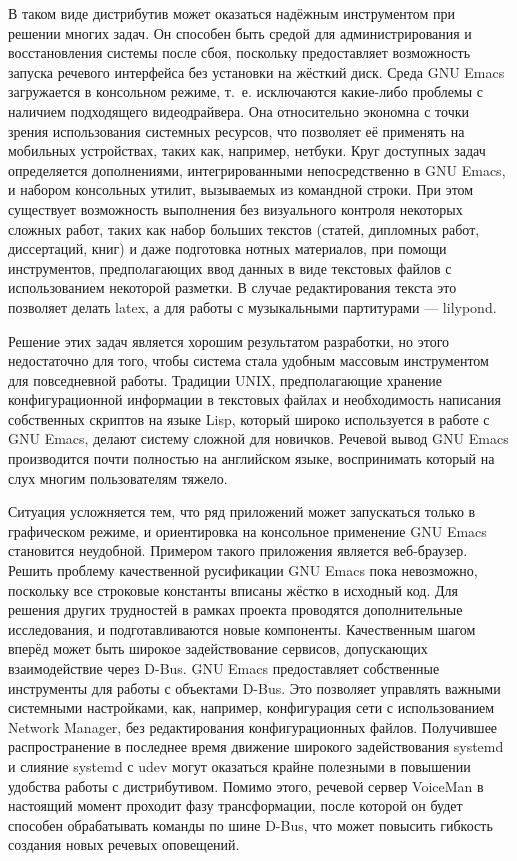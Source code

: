 \documentclass[10pt, a5paper]{article}
\begin{document}
В таком виде дистрибутив может оказаться надёжным инструментом при решении многих задач. Он способен быть средой для администрирования и восстановления системы после сбоя, поскольку предоставляет возможность запуска речевого интерфейса без установки на жёсткий диск. Среда GNU Emacs загружается в консольном режиме, т.~е. исключаются какие-либо проблемы с наличием подходящего видеодрайвера. Она относительно экономна с точки зрения использования системных ресурсов, что позволяет её применять на мобильных устройствах, таких как, например, нетбуки. Круг доступных задач определяется дополнениями, интегрированными непосредственно в GNU Emacs, и набором консольных утилит, вызываемых из командной строки. При этом существует возможность выполнения без визуального контроля некоторых сложных работ, таких как набор больших текстов (статей, дипломных работ, диссертаций, книг) и даже подготовка нотных материалов, при помощи инструментов, предполагающих ввод данных в виде текстовых файлов с использованием некоторой разметки. В случае редактирования текста это позволяет делать latex, а для работы с музыкальными партитурами --- lilypond.

Решение этих задач является хорошим результатом разработки, но этого 
недостаточно для того, чтобы система стала удобным массовым инструментом для повседневной работы. Традиции UNIX, предполагающие хранение конфигурационной информации в текстовых файлах и необходимость написания собственных скриптов на языке Lisp, который широко используется в работе с GNU Emacs, делают систему сложной для новичков. Речевой вывод GNU Emacs производится почти полностью на английском языке, воспринимать который на слух многим пользователям тяжело.

Ситуация усложняется тем, что ряд приложений может запускаться только в графическом режиме, и ориентировка на консольное применение GNU Emacs становится неудобной. Примером такого приложения является веб-браузер. Решить проблему качественной русификации GNU Emacs пока невозможно, поскольку все строковые константы вписаны жёстко в исходный код. Для решения других трудностей в рамках проекта проводятся дополнительные исследования, и подготавливаются новые компоненты. Качественным шагом вперёд может быть широкое задействование сервисов, допускающих взаимодействие через D-Bus. GNU Emacs предоставляет собственные инструменты для работы с объектами D-Bus. Это позволяет управлять важными системными настройками, как, например, конфигурация сети с использованием Network Manager, без редактирования конфигурационных файлов. Получившее распространение в последнее время движение широкого задействования systemd и слияние systemd с udev могут оказаться крайне полезными в повышении удобства работы с дистрибутивом. Помимо этого, речевой сервер VoiceMan в настоящий момент проходит фазу трансформации, после которой он будет способен обрабатывать команды по шине D-Bus, что может повысить гибкость создания новых речевых оповещений.
\end{document}

